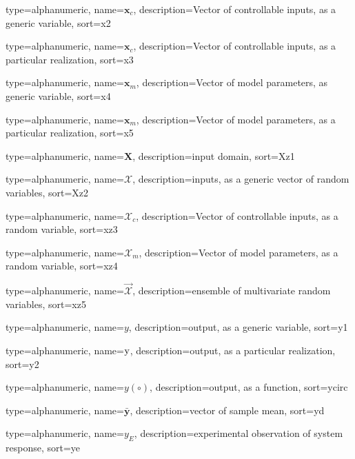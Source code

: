 {
  type=alphanumeric,
	name={\ensuremath{\bm{x}_c}},
	description={Vector of controllable inputs, as a generic variable},
	sort={x2}
}

{
  type=alphanumeric,
	name={\ensuremath{\mathbf{x}_c}},
	description={Vector of controllable inputs, as a particular realization},
	sort={x3}
}

{
  type=alphanumeric,
	name={\ensuremath{\bm{x}_m}},
	description={Vector of model parameters, as generic variable},
	sort={x4}
}

{
  type=alphanumeric,
	name={\ensuremath{\mathbf{x}_m}},
	description={Vector of model parameters, as a particular realization},
	sort={x5}
}

{
  type=alphanumeric,
	name={\ensuremath{\mathbf{X}}},
	description={input domain},
	sort={Xz1}
}

{
  type=alphanumeric,
	name={\ensuremath{\bm{\mathcal{X}}}},
	description={inputs, as a generic vector of random variables},
	sort={Xz2}
}

{
  type=alphanumeric,
	name={\ensuremath{\bm{\mathcal{X}}_c}},
	description={Vector of controllable inputs, as a random variable},
	sort={xz3}
}	

{
  type=alphanumeric,
	name={\ensuremath{\bm{\mathcal{X}}_m}},
	description={Vector of model parameters, as a random variable},
	sort={xz4}
}

{
  type=alphanumeric,
	name={\ensuremath{\vec{\bm{\mathcal{X}}}}},
	description={ensemble of multivariate random variables},
	sort={xz5}
}

{
  type=alphanumeric,
	name={\ensuremath{y}},
	description={output, as a generic variable},
	sort={y1}
}

{
  type=alphanumeric,
	name={$\textnormal{y}$},
	description={output, as a particular realization},
	sort={y2}
}

{
  type=alphanumeric,
	name={\ensuremath{y (\circ)}},
	description={output, as a function},
	sort={ycirc}
}

{
  type=alphanumeric,
	name={\ensuremath{\mathbf{\bar{y}}}},
	description={vector of sample mean},
	sort={yd}
}

{
  type=alphanumeric,
	name={\ensuremath{y_E}},
	description={experimental observation of system response},
	sort={ye}
}

